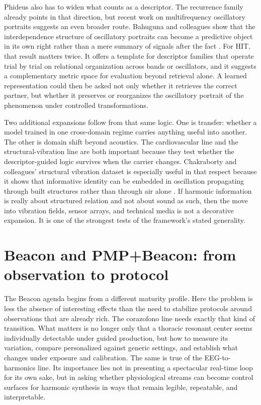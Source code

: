 Phideus also has to widen what counts as a descriptor. The recurrence family already points in that direction, but recent work on multifrequency oscillatory portraits suggests an even broader route. Bahuguna and colleagues show that the interdependence structure of oscillatory portraits can become a predictive object in its own right rather than a mere summary of signals after the fact \parencite{bahuguna_2025}. For HIT, that result matters twice. It offers a template for descriptor families that operate trial by trial on relational organization across bands or oscillators, and it suggests a complementary metric space for evaluation beyond retrieval alone. A learned representation could then be asked not only whether it retrieves the correct partner, but whether it preserves or reorganizes the oscillatory portrait of the phenomenon under controlled transformations.

Two additional expansions follow from that same logic. One is transfer: whether a model trained in one cross-domain regime carries anything useful into another. The other is domain shift beyond acoustics. The cardiovascular line and the structural-vibration line are both important because they test whether the descriptor-guided logic survives when the carrier changes. Chakraborty and colleagues' structural vibration dataset is especially useful in that respect because it shows that informative identity can be embedded in oscillation propagating through built structures rather than through air alone \parencite{chakraborty_2025}. If harmonic information is really about structured relation and not about sound as such, then the move into vibration fields, sensor arrays, and technical media is not a decorative expansion. It is one of the strongest tests of the framework's stated generality.


\section{Beacon and PMP+Beacon: from observation to protocol}


The Beacon agenda begins from a different maturity profile. Here the problem is less the absence of interesting effects than the need to stabilize protocols around observations that are already rich. The corazofono line needs exactly that kind of transition. What matters is no longer only that a thoracic resonant center seems individually detectable under guided production, but how to measure its variation, compare personalized against generic settings, and establish what changes under exposure and calibration. The same is true of the EEG-to-harmonics line. Its importance lies not in presenting a spectacular real-time loop for its own sake, but in asking whether physiological streams can become control surfaces for harmonic synthesis in ways that remain legible, repeatable, and interpretable.


